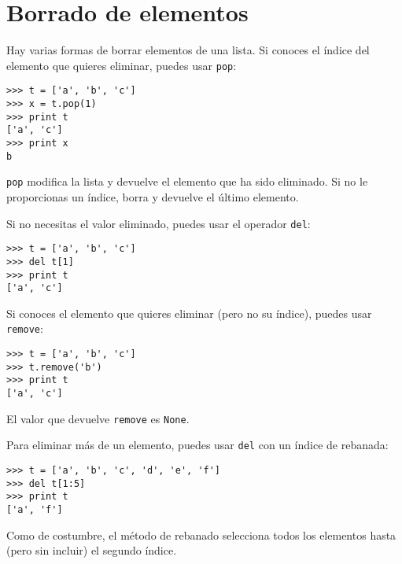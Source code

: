 
\section{Borrado de elementos}


Hay varias formas de borrar elementos de una lista. Si conoces
el índice del elemento que quieres eliminar, puedes usar
{\tt pop}:


\beforeverb
\begin{verbatim}
>>> t = ['a', 'b', 'c']
>>> x = t.pop(1)
>>> print t
['a', 'c']
>>> print x
b
\end{verbatim}
\afterverb
%
{\tt pop} modifica la lista y devuelve el elemento que ha sido eliminado.
Si no le proporcionas un índice, borra y devuelve el
último elemento.

Si no necesitas el valor eliminado, puedes usar el operador
{\tt del}:


\beforeverb
\begin{verbatim}
>>> t = ['a', 'b', 'c']
>>> del t[1]
>>> print t
['a', 'c']
\end{verbatim}
\afterverb
%

Si conoces el elemento que quieres eliminar (pero no su índice), puedes
usar {\tt remove}:


\beforeverb
\begin{verbatim}
>>> t = ['a', 'b', 'c']
>>> t.remove('b')
>>> print t
['a', 'c']
\end{verbatim}
\afterverb
%
El valor que devuelve {\tt remove} es {\tt None}.


Para eliminar más de un elemento, puedes usar {\tt del} con
un índice de rebanada:

\beforeverb
\begin{verbatim}
>>> t = ['a', 'b', 'c', 'd', 'e', 'f']
>>> del t[1:5]
>>> print t
['a', 'f']
\end{verbatim}
\afterverb
%
Como de costumbre, el método de rebanado selecciona todos los elementos hasta (pero
sin incluir) el segundo índice.

